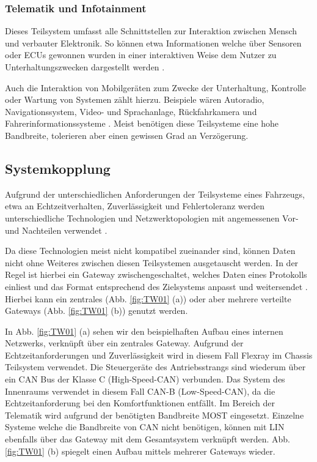         \subsubsection{Telematik und Infotainment}
        Dieses Teilsystem umfasst alle Schnittstellen zur Interaktion zwischen Mensch und verbauter Elektronik. So können etwa Informationen welche über Sensoren
        oder ECUs gewonnen wurden in einer interaktiven Weise dem Nutzer zu Unterhaltungszwecken dargestellt werden \cite{TW_huang2018vehicle}.
        
        Auch die Interaktion von Mobilgeräten
        zum Zwecke der Unterhaltung, Kontrolle oder Wartung von Systemen zählt hierzu. Beispiele wären Autoradio, Navigationssystem, Video- und Sprachanlage, Rückfahrkamera und Fahrerinformationssysteme \cite{reif2011bosch}.
        Meist benötigen diese Teilsysteme eine hohe Bandbreite, tolerieren aber einen gewissen Grad an Verzögerung.
    \subsection{Systemkopplung}
    Aufgrund der unterschiedlichen Anforderungen der Teilsysteme eines Fahrzeugs, etwa an Echtzeitverhalten, Zuverlässigkeit und Fehlertoleranz werden unterschiedliche Technologien
    und Netzwerktopologien mit angemessenen Vor- und Nachteilen verwendet \cite{leen1999digital}. 
    
    Da diese Technologien meist nicht kompatibel zueinander sind, können Daten nicht ohne Weiteres zwischen diesen
    Teilsystemen ausgetauscht werden. In der Regel ist hierbei ein Gateway zwischengeschaltet, welches Daten eines Protokolls einliest und das Format entsprechend des Zielsystems anpasst
    und weitersendet \cite{reif2011bosch}\cite{TW_kim2014gateway}. Hierbei kann ein zentrales (Abb. \ref{fig:TW01} (a)) oder aber mehrere verteilte Gateways (Abb. \ref{fig:TW01} (b)) genutzt werden. 

    In Abb. \ref{fig:TW01} (a) sehen wir den beispielhaften Aufbau eines internen Netzwerks, verknüpft über ein zentrales Gateway. Aufgrund der Echtzeitanforderungen und Zuverlässigkeit wird in diesem Fall Flexray
    im Chassis Teilsystem verwendet. Die Steuergeräte des Antriebsstrangs sind wiederum über ein CAN Bus der Klasse C (High-Speed-CAN) verbunden. Das System des Innenraums verwendet in diesem Fall 
    CAN-B (Low-Speed-CAN), da die Echtzeitanforderung bei den Komfortfunktionen entfällt. Im Bereich der Telematik wird aufgrund der benötigten Bandbreite MOST eingesetzt. Einzelne Systeme welche die
    Bandbreite von CAN nicht benötigen, können mit LIN ebenfalls über das Gateway mit dem Gesamtsystem verknüpft werden.
    Abb. \ref{fig:TW01} (b) spiegelt einen Aufbau mittels mehrerer Gateways wieder.

